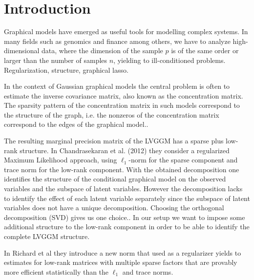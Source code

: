 \section{Introduction}
\label{intro}


Graphical models have emerged as useful tools for modelling complex systems. In many fields such as genomics and finance among others, we have to analyze high-dimensional data, where the dimension of the sample $p$ is of the same order or larger than the number of samples $n$, yielding to ill-conditioned problems. 
Regularization, structure, graphical lasso. 

In the context of Gaussian graphical models the central problem is often to estimate the inverse covariance matrix, also known as the concentration matrix. The sparsity pattern of the concentration matrix in such models correspond to the structure of the graph, i.e. the nonzeros of the concentration matrix correspond to the edges of the graphical model.. \\


The resulting marginal precision matrix of the LVGGM has a sparse plus low-rank structure. In Chandrasekaran et al. (2012) they consider a regularized Maximum Likelihood approach, using $\ell_1$-norm for the sparse component and trace norm for the low-rank component. With the obtained decomposition one identifies the structure of the conditional graphical model on the observed variables and the subspace of latent variables. However the decomposition lacks to identify the effect of each latent variable separately since the subspace of latent variables does not have a unique decomposition. Choosing the orthogonal decomposition (SVD) gives us one choice.. In our setup we want to impose some additional structure to the low-rank component in order to be able to identify the complete LVGGM structure.  

In Richard et al they introduce a new norm that used as a regularizer yields to  estimates for low-rank matrices with multiple sparse factors that are provably more efficient statistically than the $\ell_1$ and trace norms.

